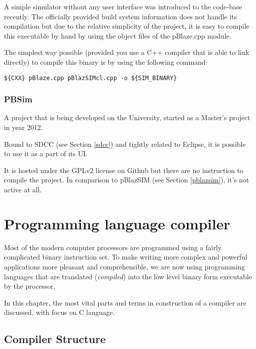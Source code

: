            A simple simulator without any user interface was introduced to the code-base recently. The officially provided build system information does not handle its compilation but due to the relative simplicity of the project, it is easy to compile this executable by hand by using the object files of the pBlaze.cpp module.

            The simplest way possible (provided you use a C++ compiler that is able to link directly) to compile this binary is by using the following command:

            \begin{center}
                \texttt{\$\{CXX\} pBlaze.cpp pBlazSIMcl.cpp -o \$\{SIM\_BINARY\}}
            \end{center}

        \subsection{PBSim}\label{pbsim}

        A project that is being developed on the University, started as a Master's project in year 2012.\cite{PbsimProj}

        Bound to SDCC (see Section \ref{sdcc}) and tightly related to Eclipse, it is possible to use it as a part of its UI.

        It is hosted under the GPLv2 license on Github \cite{PbsimRepo} but there are no instruction to compile the project. In comparison to pBlazSIM (see Section \ref{pblazsim}), it's not active at all.

\chapter{Programming language compiler}

Most of the modern computer processors are programmed using a fairly complicated binary instruction set. To make writing more complex and powerful applications more pleasant and comprehensible, we are now using programming languages that are translated (\emph{compiled}) into the low level binary form executable by the processor.

In this chapter, the most vital parts and terms in construction of a compiler are discussed, with focus on C language.\cite{DragonBook}

    \section{Compiler Structure}

